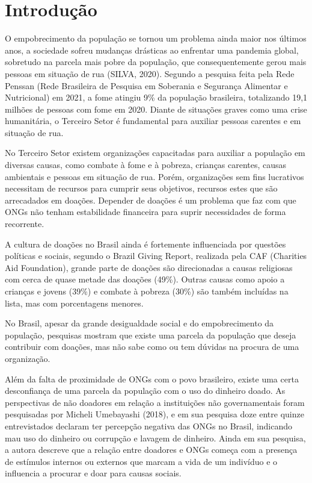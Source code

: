 \documentclass[conference]{IEEEtran}
\begin{document}
\section{Introdução}
	O empobrecimento da população se tornou um problema ainda maior nos últimos anos, a sociedade sofreu mudanças drásticas ao enfrentar uma pandemia global, sobretudo na parcela mais pobre da população, que consequentemente gerou mais pessoas em situação de rua (SILVA, 2020). Segundo a pesquisa feita pela Rede Penssan (Rede Brasileira de Pesquisa em Soberania e Segurança Alimentar e Nutricional) em 2021, a fome atingiu 9\% da população brasileira, totalizando 19,1 milhões de pessoas com fome em 2020. Diante de situações graves como uma crise humanitária, o Terceiro Setor é fundamental para auxiliar pessoas carentes e em situação de rua.

No Terceiro Setor existem organizações capacitadas para auxiliar a população em diversas causas, como combate à fome e à pobreza, crianças carentes, causas ambientais e pessoas em situação de rua. Porém, organizações sem fins lucrativos necessitam de recursos para cumprir seus objetivos, recursos estes que são arrecadados em doações. Depender de doações é um problema que faz com que ONGs não tenham estabilidade financeira para suprir necessidades de forma recorrente. 

A cultura de doações no Brasil ainda é fortemente influenciada por questões políticas e sociais, segundo o Brazil Giving Report, realizada pela CAF (Charities Aid Foundation), grande parte de doações são direcionadas a causas religiosas com cerca de quase metade das doações (49\%). Outras causas como apoio a crianças e jovens (39\%) e combate à pobreza (30\%) são também incluídas na lista, mas com porcentagens menores. 

No Brasil, apesar da grande desigualdade social e do empobrecimento da população, pesquisas mostram que existe uma parcela da população que deseja contribuir com doações, mas não sabe como ou tem dúvidas na procura de uma organização. 

Além da falta de proximidade de ONGs com o povo brasileiro, existe uma certa desconfiança de uma parcela da população com o uso do dinheiro doado. As perspectivas de não doadores em relação a instituições não governamentais foram pesquisadas por Micheli Umebayashi (2018), e em sua pesquisa doze entre quinze entrevistados declaram ter percepção negativa das ONGs no Brasil, indicando mau uso do dinheiro ou corrupção e lavagem de dinheiro. Ainda em sua pesquisa, a autora descreve que a relação entre doadores e ONGs começa com a presença de estímulos internos ou externos que marcam a vida de um indivíduo e o influencia a procurar e doar para causas sociais. \cite{umebayashi2018doaccoes}
\end{document}
